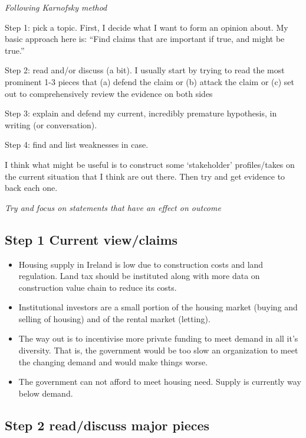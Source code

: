 \documentclass[11pt]{article}
\begin{document}
\emph{Following Karnofsky method}

Step 1: pick a topic. First, I decide what I want to form an opinion
about. My basic approach here is: ``Find claims that are important if
true, and might be true.''

Step 2: read and/or discuss (a bit). I usually start by trying to read
the most prominent 1-3 pieces that (a) defend the claim or (b) attack
the claim or (c) set out to comprehensively review the evidence on both
sides

Step 3: explain and defend my current, incredibly premature hypothesis,
in writing (or conversation).

Step 4: find and list weaknesses in case.

I think what might be useful is to construct some `stakeholder'
profiles/takes on the current situation that I think are out there. Then
try and get evidence to back each one.

\emph{Try and focus on statements that have an effect on outcome}

\hypertarget{step-1-current-viewclaims}{%
\subsection{Step 1 Current
view/claims}\label{step-1-current-viewclaims}}

\begin{itemize}
\tightlist
\item
  Housing supply in Ireland is low due to construction costs and land
  regulation. Land tax should be instituted along with more data on
  construction value chain to reduce its costs.
\item
  Institutional investors are a small portion of the housing market
  (buying and selling of housing) and of the rental market (letting).
\item
  The way out is to incentivise more private funding to meet demand in
  all it's diversity. That is, the government would be too slow an
  organization to meet the changing demand and would make things worse.
\item
  The government can not afford to meet housing need. Supply is
  currently way below demand.
\end{itemize}

\hypertarget{step-2-readdiscuss-major-pieces}{%
\subsection{Step 2 read/discuss major
pieces}\label{step-2-readdiscuss-major-pieces}}
\end{document}
